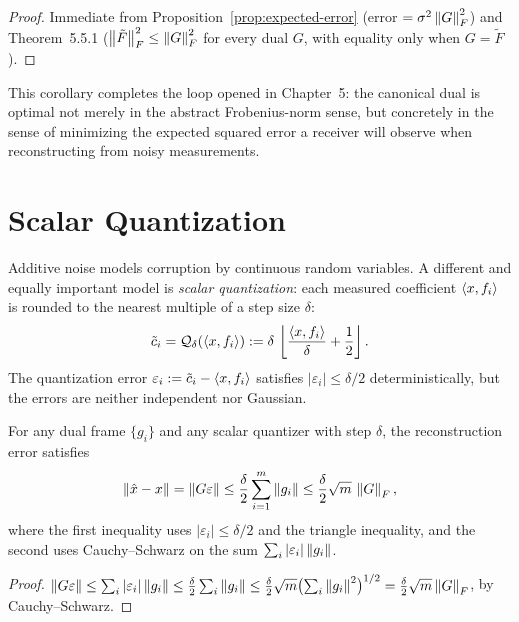 \begin{proof}
Immediate from Proposition~\ref{prop:expected-error} (error $=
\sigma^2\left\| G \right\|_F^2$) and Theorem~5.5.1 ($\left\| \tilde F \right\|_F^2 \le
\left\| G \right\|_F^2$ for every dual $G$, with equality only when $G=\tilde F$).
\end{proof}

This corollary completes the loop opened in Chapter~5: the canonical
dual is optimal not merely in the abstract Frobenius-norm sense, but
concretely in the sense of minimizing the expected squared error a
receiver will observe when reconstructing from noisy measurements.

\section{Scalar Quantization}
\label{sec:scalar-quantization}

Additive noise models corruption by continuous random variables. A
different and equally important model is \emph{scalar quantization}:
each measured coefficient $\left\langle x, f_i \right\rangle$ is rounded to the nearest
multiple of a step size $\delta$:
\[
  \tilde c_i = \mathcal{Q}_\delta(\left\langle x, f_i \right\rangle)
  := \delta\,\left\lfloor \frac{\left\langle x, f_i \right\rangle}{\delta} + \frac12\right\rfloor.
\]
The quantization error $\varepsilon_i := \tilde c_i - \left\langle x, f_i \right\rangle$
satisfies $|\varepsilon_i|\le\delta/2$ deterministically, but the
errors are neither independent nor Gaussian.

\begin{proposition}
\label{prop:quantization-error}
For any dual frame $\{g_i\}$ and any scalar quantizer with step $\delta$,
the reconstruction error satisfies
\begin{equation}
\label{eq:quant-bound}
  \left\| \hat x - x \right\|
  = \left\| G\varepsilon \right\|
  \le \frac{\delta}{2}\sum_{i=1}^m \left\| g_i \right\|
  \le \frac{\delta}{2}\sqrt{m}\,\left\| G \right\|_F,
\end{equation}
where the first inequality uses $|\varepsilon_i|\le\delta/2$ and the
triangle inequality, and the second uses Cauchy--Schwarz on the sum
$\sum_i|\varepsilon_i|\left\| g_i \right\|$.
\end{proposition}

\begin{proof}
$\left\| G\varepsilon \right\|\le\sum_i|\varepsilon_i|\left\| g_i \right\|\le\tfrac{\delta}{2}
\sum_i\left\| g_i \right\|\le\tfrac{\delta}{2}\sqrt{m}\bigl(\sum_i\left\| g_i \right\|^2\bigr)^{1/2}
=\tfrac{\delta}{2}\sqrt{m}\left\| G \right\|_F$, by Cauchy--Schwarz.
\end{proof}

